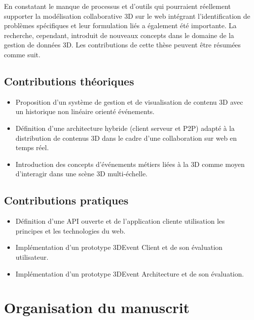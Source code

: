 En constatant le manque de processus et d'outils qui pourraient réellement supporter la modélisation collaborative \gls{3D} sur le web intégrant l'identification de problèmes spécifiques et leur formulation liés a également été importante. 
La recherche, cependant, introduit de nouveaux concepts dans le domaine de la gestion de 
données \gls{3D}. Les contributions de cette thèse peuvent être résumées comme 
suit.


\subsection{Contributions théoriques}

\begin{itemize}
	\item {}Proposition d'un système de 
	gestion et de visualisation de contenu \gls{3D} avec un historique non linéaire 
	orienté événements.
	\item Définition d'une architecture hybride (client serveur et \gls{P2P}) adapté à 
	la distribution de contenus \gls{3D} dans le cadre d'une collaboration sur web en 
	temps réel.
	\item Introduction des concepts d'événements métiers liées à la \gls{3D} 
	comme moyen d'interagir dans une scène \gls{3D} multi-échelle.
\end{itemize}
\subsection{Contributions pratiques}
\begin{itemize}
	\item {}Définition d'une API ouverte et 
	de l'application cliente utilisation les principes et les technologies du web.
	\item Implémentation d'un prototype 3DEvent Client et de son évaluation 
	utilisateur. 
	\item Implémentation d'un prototype 3DEvent Architecture et de son évaluation.
	
\end{itemize}


\section{Organisation du manuscrit}

